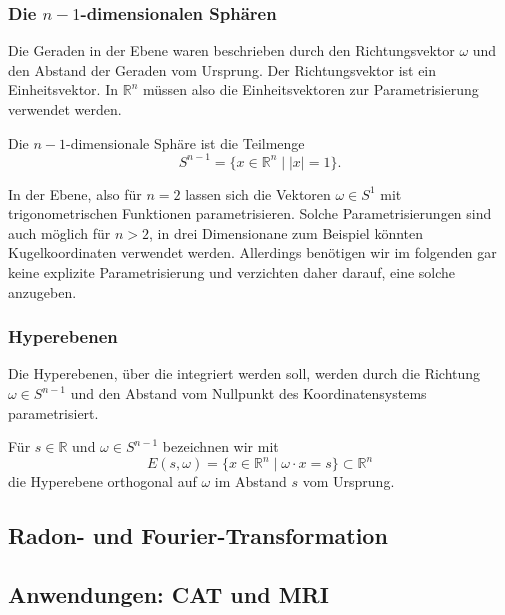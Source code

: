 %
%
\subsubsection{Die $n-1$-dimensionalen Sphären}
Die Geraden in der Ebene waren beschrieben durch den Richtungsvektor
$\omega$ und den Abstand der Geraden vom Ursprung.
Der Richtungsvektor ist ein Einheitsvektor.
In $\mathbb{R}^n$ müssen also die Einheitsvektoren zur Parametrisierung
verwendet werden.

\begin{definition}
Die $n-1$-dimensionale Sphäre ist die Teilmenge
\[
S^{n-1}
=
\{
x\in\mathbb{R}^n
\mid
|x|=1
\}.
\]
\end{definition}

In der Ebene, also für $n=2$ lassen sich die Vektoren $\omega\in S^1$
mit trigonometrischen Funktionen parametrisieren.
Solche Parametrisierungen sind auch möglich für $n>2$, in drei
Dimensionane zum Beispiel könnten Kugelkoordinaten verwendet werden.
Allerdings benötigen wir im folgenden gar keine explizite Parametrisierung
und verzichten daher darauf, eine solche anzugeben.

%
%
\subsubsection{Hyperebenen}
Die Hyperebenen, über die integriert werden soll, werden durch die
Richtung $\omega\in S^{n-1}$ und den Abstand vom Nullpunkt des
Koordinatensystems parametrisiert.

\begin{definition}
Für $s\in\mathbb{R}$ und $\omega\in S^{n-1}$ bezeichnen wir mit
\[
E(s,\omega)
=
\{
x\in\mathbb{R}^n
\mid
\omega\cdot x = s
\}
\subset
\mathbb{R}^n
\]
die Hyperebene orthogonal auf $\omega$ im Abstand $s$ vom Ursprung.
\end{definition}

%
%
\subsection{Radon- und Fourier-Transformation
\label{buch:radon:definition:subsection:radonfourier}}

%
%
\subsection{Anwendungen: CAT und MRI
\label{buch:radon:definition:subsection:catmri}}







